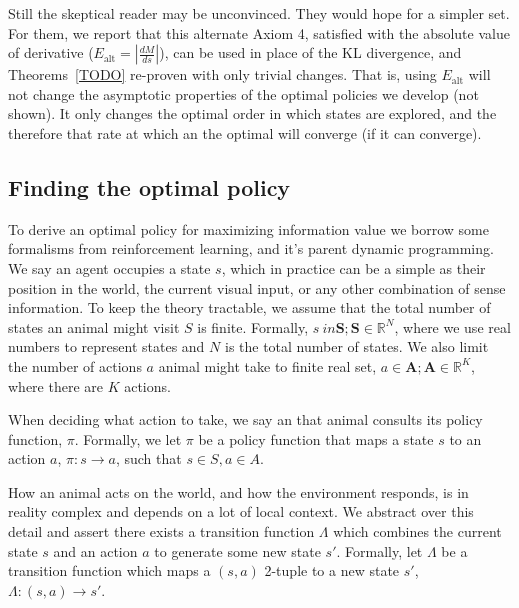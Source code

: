\documentclass[9pt,twocolumn,twoside]{pnas-new}
\begin{document}
Still the skeptical reader may be unconvinced. They would hope for a simpler set. For them, we report that this alternate Axiom 4, satisfied with the absolute value of derivative ($E_{\text{alt}} = |\frac{dM}{ds}|$), can be used in place of the KL divergence, and Theorems~\ref{TODO} re-proven with only trivial changes. That is, using $E_{\text{alt}}$ will not change the asymptotic properties of the optimal policies we develop (not shown). It only changes the optimal order in which states are explored, and the therefore that rate at which an the optimal will converge (if it can converge). 


\subsection*{Finding the optimal policy}
To derive an optimal policy for maximizing information value we borrow some formalisms from reinforcement learning, and it's parent dynamic programming. We say an agent occupies a state $s$, which in practice can be a simple as their position in the world, the current visual input, or any other combination of sense information. To keep the theory tractable, we assume that the total number of states an animal might visit $S$ is finite. Formally, $s\ in \textbf{S}; \textbf{S} \in \mathbb{R}^N$, where we use real numbers to represent states and $N$ is the total number of states. We also limit the number of actions $a$ animal might take to finite real set, $a \in \textbf{A}; \textbf{A} \in \mathbb{R}^K$, where there are $K$ actions. 

When deciding what action to take, we say an that animal consults its policy function, $\pi$. Formally, we let $\pi$ be a policy function that maps a state $s$ to an action $a$, $\pi : s \rightarrow a$, such that $s \in S, a \in A$.

How an animal acts on the world, and how the environment responds, is in reality complex and depends on a lot of local context. %
 We abstract over this detail and assert there exists a transition function $\Lambda$ which combines the current state $s$ and an action $a$ to generate some new state $s'$. Formally, let $\Lambda$ be a transition function which maps a $(s,a)$ 2-tuple to a new state $s'$, $\Lambda : (s, a) \rightarrow s'$. 
\end{document}
